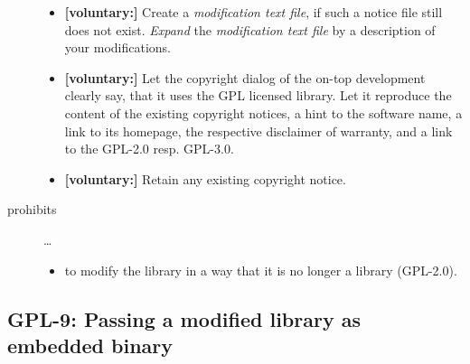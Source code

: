 \begin{description}
\begin{itemize}
  \item \textbf{[voluntary:]} Create a \emph{modification text file}, if such a
  notice file still does not exist. \emph{Expand} the \emph{modification text
  file} by a description of your modifications.
    
  
  \item \textbf{[voluntary:]} Let the copyright dialog of the on-top development
  clearly say, that it uses the GPL licensed library. Let it reproduce the
  content of the existing copyright notices, a hint to the software name, a link
  to its homepage, the respective disclaimer of warranty, and a link to the
  GPL-2.0 resp. GPL-3.0.   
  
  \item \textbf{[voluntary:]} Retain any existing copyright notice. 
  
\end{itemize}

\item[prohibits] \ldots
\begin{itemize}
  \item to modify the library in a way that it is no longer a library
  (GPL-2.0).
\end{itemize}

\end{description}


\subsection{GPL-9: Passing a modified library as embedded binary}

